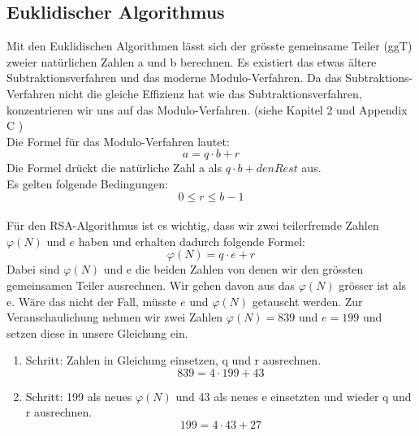\subsection{Euklidischer Algorithmus}\label{euklidischer_Algorithmus}
Mit den Euklidischen Algorithmen lässt sich der grösste gemeinsame Teiler (ggT) zweier natürlichen Zahlen a und b berechnen. Es existiert das etwas ältere Subtraktionsverfahren und das moderne Modulo-Verfahren. Da das Subtraktions-Verfahren nicht die gleiche Effizienz hat wie das Subtraktionsverfahren, konzentrieren wir uns auf das Modulo-Verfahren. (siehe  Kapitel 2 \cite{zahlentheorie_fuer_einsteiger} und  Appendix C \cite{kryptographie})\\
%
Die Formel für das Modulo-Verfahren lautet:
%
\begin{equation}
  \label{eqn:euklidischer_algo}
  a = q \cdot b + r 
\end{equation}
%
Die Formel drückt die natürliche Zahl a als $ q \cdot b + den Rest $ aus. \\
Es gelten folgende Bedingungen:
\begin{equation*}
  0 \leq r \leq b - 1
\end{equation*}
\\
%
Für den RSA-Algorithmus ist es wichtig, dass wir zwei teilerfremde Zahlen $\varphi(N)$ und $e$ haben und erhalten dadurch folgende Formel:\\
\begin{equation}
  \label{eqn:euklidischer_algo_RSA}
  \varphi(N) = q \cdot e + r 
\end{equation}
%
Dabei sind $\varphi(N)$ und e die beiden Zahlen von denen wir den grössten gemeinsamen Teiler ausrechnen.
Wir gehen davon aus das $\varphi(N)$ grösser ist als e. Wäre das nicht der Fall, müsste $ e $ und $ \varphi(N) $  getauscht werden.
Zur Veranschaulichung nehmen wir zwei Zahlen $\varphi(N) = 839$ und $e = 199$ und setzen diese in unsere Gleichung ein.
\begin{enumerate}
  \item Schritt: Zahlen in Gleichung einsetzen, q und r ausrechnen.\\
    \begin{equation*}
      839 = 4 \cdot 199 + 43
    \end{equation*}
  \item Schritt: 199 als neues $\varphi(N)$ und 43 als neues e einsetzten und wieder q und r ausrechnen.\\
    \begin{equation*}
      199 = 4 \cdot 43 + 27
    \end{equation*}
\end{enumerate}
